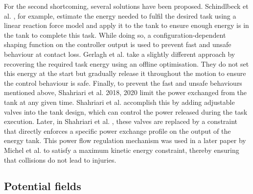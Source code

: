 For the second shortcoming, several solutions have been proposed. Schindlbeck et al. \cite{schindlbeckUnifiedPassivitybasedCartesian2015}, for example, estimate the energy needed to fulfil the desired task using a linear reaction force model and apply it to the tank to ensure enough energy is in the tank to complete this task. While doing so, a configuration-dependent shaping function on the controller output is used to prevent fast and unsafe behaviour at contact loss. Gerlagh et al. \cite{gerlaghEnergyawareAdaptiveImpedance2021} take a slightly different approach by recovering the required task energy using an offline optimisation. They do not set this energy at the start but gradually release it throughout the motion to ensure the control behaviour is safe. Finally, to prevent the fast and unsafe behaviours mentioned above, Shahriari et al. 2018, 2020 \cite{shahriariValvebasedVirtualEnergy2018,shahriariPowerFlowRegulation2020,michelSafetyAwareHierarchicalPassivityBased2022} limit the power exchanged from the tank at any given time. Shahriari et al. \cite{shahriariValvebasedVirtualEnergy2018} accomplish this by adding adjustable valves into the tank design, which can control the power released during the task execution. Later, in Shahriari et al. \cite{shahriariPowerFlowRegulation2020}, these valves are replaced by a constraint that directly enforces a specific power exchange profile on the output of the energy tank. This power flow regulation mechanism was used in a later paper by Michel et al. \cite{michelSafetyAwareHierarchicalPassivityBased2022} to satisfy a maximum kinetic energy constraint, thereby ensuring that collisions do not lead to injuries.

\subsection{Potential fields}

